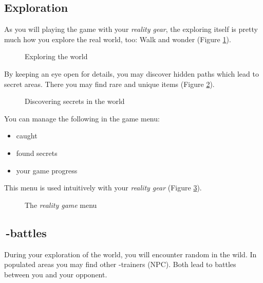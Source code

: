 \subsection{Exploration}

As you will playing the game with your \emph{\poke{} reality gear}, the exploring itself is pretty much how you explore the real world, too: Walk and wonder (Figure \ref{exploration}).

\begin{figure}[!ht]
\begin{center}
{%
\setlength{\fboxsep}{2pt}%
\setlength{\fboxrule}{1pt}%
%
}%
\end{center}
\caption[Exploring the \pokeT{} world]{Exploring the \poke{} world}
\label{exploration}
\end{figure}

By keeping an eye open for details, you may discover hidden paths which lead to secret areas. There you may find rare \poke{} and unique items (Figure \ref{secrets}).

\begin{figure}[!ht]
\begin{center}
{%
\setlength{\fboxsep}{2pt}%
\setlength{\fboxrule}{1pt}%
%
}%
\end{center}
\caption[Discovering secrets in the \pokeT{} world]{Discovering secrets in the \poke{} world}
\label{secrets}
\end{figure}

You can manage the following in the game menu:
\begin{itemize}
\item caught \poke{}
\item found secrets
\item your game progress
\end{itemize}
This menu is used intuitively with your \emph{\poke{} reality gear} (Figure \ref{menu}).

\begin{figure}[!ht]
\begin{center}
{%
\setlength{\fboxsep}{2pt}%
\setlength{\fboxrule}{1pt}%
%
}%
\end{center}
\caption[The \emph{\pokeT{} reality game} menu]{The \emph{\poke{} reality game} menu}
\label{menu}
\end{figure}

\subsection[\pokeT{}-battles]{\poke{}\,-battles}
During your exploration of the \poke{} world, you will encounter random \poke{} in the wild. In populated areas you may find other \poke{}-trainers (NPC). Both lead to \poke{} battles between you and your opponent.

